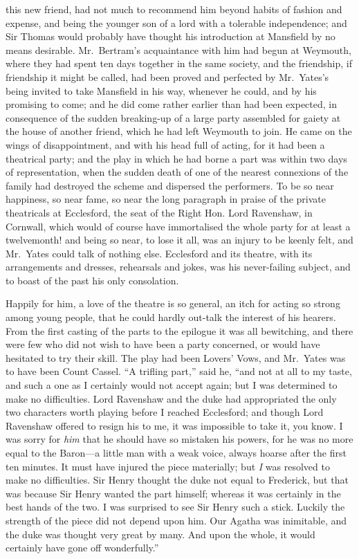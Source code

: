  this new friend, had not much
to recommend him beyond habits of fashion and expense,
and being the younger son of a lord with a tolerable
independence; and Sir Thomas would probably have thought
his introduction at Mansfield by no means desirable.
Mr.\ Bertram's acquaintance with him had begun at Weymouth,
where they had spent ten days together in the same society,
and the friendship, if friendship it might be called,
had been proved and perfected by Mr.\ Yates's being invited
to take Mansfield in his way, whenever he could, and by his
promising to come; and he did come rather earlier than had
been expected, in consequence of the sudden breaking-up
of a large party assembled for gaiety at the house
of another friend, which he had left Weymouth to join.
He came on the wings of disappointment, and with his head
full of acting, for it had been a theatrical party;
and the play in which he had borne a part was within
two days of representation, when the sudden death
of one of the nearest connexions of the family had
destroyed the scheme and dispersed the performers.
To be so near happiness, so near fame, so near the long
paragraph in praise of the private theatricals at Ecclesford,
the seat of the Right Hon. Lord Ravenshaw, in Cornwall,
which would of course have immortalised the whole party
for at least a twelvemonth! and being so near, to lose
it all, was an injury to be keenly felt, and Mr.\ Yates
could talk of nothing else.  Ecclesford and its theatre,
with its arrangements and dresses, rehearsals and jokes,
was his never-failing subject, and to boast of the past his
only consolation.

Happily for him, a love of the theatre is so general,
an itch for acting so strong among young people, that he
could hardly out-talk the interest of his hearers.
From the first casting of the parts to the epilogue
it was all bewitching, and there were few who did
not wish to have been a party concerned, or would have
hesitated to try their skill.  The play had been Lovers'
Vows, and Mr.\ Yates was to have been Count Cassel.
``A trifling part,'' said he, ``and not at all to my taste,
and such a one as I certainly would not accept again;
but I was determined to make no difficulties.
Lord Ravenshaw and the duke had appropriated the only two
characters worth playing before I reached Ecclesford;
and though Lord Ravenshaw offered to resign his to me,
it was impossible to take it, you know.  I was sorry
for \emph{him} that he should have so mistaken his powers,
for he was no more equal to the Baron---a little man
with a weak voice, always hoarse after the first
ten minutes.  It must have injured the piece materially;
but \emph{I} was resolved to make no difficulties.
Sir Henry thought the duke not equal to Frederick,
but that was because Sir Henry wanted the part himself;
whereas it was certainly in the best hands of the two.
I was surprised to see Sir Henry such a stick.
Luckily the strength of the piece did not depend upon him.
Our Agatha was inimitable, and the duke was thought very great
by many.  And upon the whole, it would certainly have gone
off wonderfully.''

